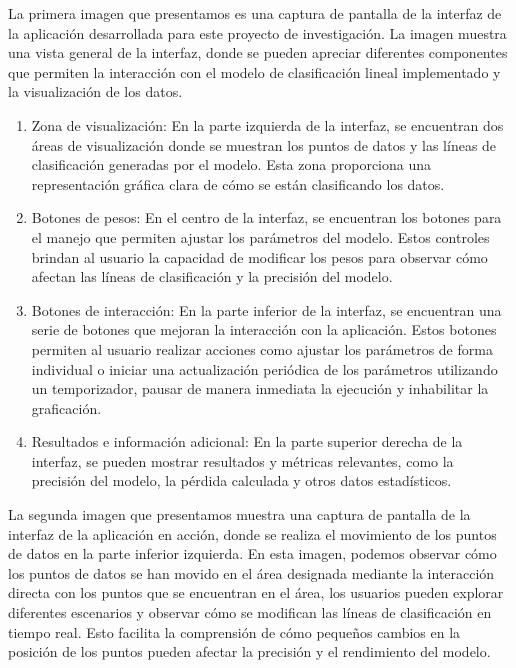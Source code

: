 \documentclass[twoside,10pt]{article}
\numberwithin{equation}{section}
\begin{document}
La primera imagen que presentamos es una captura de pantalla de la interfaz de la aplicación desarrollada para este proyecto de investigación.
La imagen muestra una vista general de la interfaz, donde se pueden apreciar diferentes componentes que permiten la interacción con el modelo de clasificación lineal implementado y la visualización de los datos. 
\begin{enumerate}
        \item Zona de visualización: En la parte izquierda de la interfaz, se encuentran dos áreas de visualización donde se muestran los puntos de datos y las líneas de clasificación generadas por el modelo. Esta zona proporciona una representación gráfica clara de cómo se están clasificando los datos.
        \item Botones de pesos: En el centro de la interfaz, se encuentran los botones para el manejo que permiten ajustar los parámetros del modelo. Estos controles brindan al usuario la capacidad de modificar los pesos para observar cómo afectan las líneas de clasificación y la precisión del modelo.
        \item Botones de interacción: En la parte inferior de la interfaz, se encuentran una serie de botones que mejoran la interacción con la aplicación. Estos botones permiten al usuario realizar acciones como ajustar los parámetros de forma individual o iniciar una actualización periódica de los parámetros utilizando un temporizador, pausar de manera inmediata la ejecución y inhabilitar la graficación.
        \item Resultados e información adicional: En la parte superior derecha de la interfaz, se pueden mostrar resultados y métricas relevantes, como la precisión del modelo, la pérdida calculada y otros datos estadísticos. 

\end{enumerate}


La segunda imagen que presentamos muestra una captura de pantalla de la interfaz de la aplicación en acción, donde se realiza el movimiento de los puntos de datos en la parte inferior izquierda. En esta imagen, podemos observar cómo los puntos de datos se han movido en el área designada mediante la interacción directa con los puntos que se encuentran en el área, los usuarios pueden explorar diferentes escenarios y observar cómo se modifican las líneas de clasificación en tiempo real. Esto facilita la comprensión de cómo pequeños cambios en la posición de los puntos pueden afectar la precisión y el rendimiento del modelo.
\end{document}

